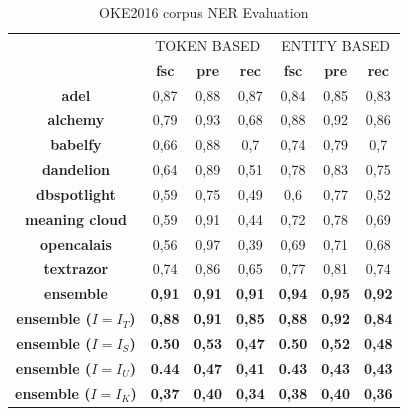 \documentclass{llncs}
\begin{document}
\begin{table}
    \setlength{\tabcolsep}{12pt}
    \centering
    \begin{tabular}{c|c|c|c|c|c|c|}
      \multicolumn{1}{c}{ } &
      \multicolumn{3}{|c|}{TOKEN BASED} & 
      \multicolumn{3}{|c|}{ENTITY BASED} \\
       \multicolumn{1}{c|}{ } & \textbf{fsc} & \textbf{pre} & \textbf{rec}
       & \textbf{fsc} & \textbf{pre} & \textbf{rec} \\ \hline
        \textbf{adel}            & 0,87   & 0,88   & 0,87 & 0,84  & 0,85  & 0,83 \\ \hline
        \textbf{alchemy}         & 0,79   & 0,93   & 0,68 & 0,88  & 0,92  & 0,86 \\ \hline
        \textbf{babelfy}         & 0,66   & 0,88   & 0,7  & 0,74  & 0,79  & 0,7  \\ \hline
        \textbf{dandelion}       & 0,64   & 0,89   & 0,51 & 0,78  & 0,83  & 0,75 \\ \hline
        \textbf{dbspotlight}     & 0,59   & 0,75   & 0,49 & 0,6   & 0,77  & 0,52 \\ \hline
        \textbf{meaning cloud}   & 0,59   & 0,91   & 0,44 & 0,72  & 0,78  & 0,69 \\ \hline
        \textbf{opencalais}      & 0,56   & 0,97   & 0,39 & 0,69  & 0,71  & 0,68 \\ \hline
        \textbf{textrazor}       & 0,74   & 0,86   & 0,65 & 0,77  & 0,81  & 0,74 \\ \hline \hline
        \textbf{ensemble}        & \textbf{0,91}   & \textbf{0,91}   & \textbf{0,91}  & \textbf{0,94} & \textbf{0,95}  & \textbf{0,92} \\ \hline
       \textbf{ensemble ($I=I_T$)}        & \textbf{0,88}   & \textbf{0,91}   & \textbf{0,85}  & \textbf{0,88} & \textbf{0,92}  & \textbf{0,84} \\\hline
       \textbf{ensemble ($I=I_S$)}        & \textbf{0.50}   & \textbf{0,53}   & \textbf{0,47}  & \textbf{0.50} & \textbf{0,52}  & \textbf{0,48} \\\hline    
       \textbf{ensemble ($I=I_U$)}        & \textbf{0.44}   & \textbf{0,47}   & \textbf{0,41}  & \textbf{0.43} & \textbf{0,43}  & \textbf{0,43} \\\hline
       \textbf{ensemble ($I=I_K$)}        & \textbf{0,37}   & \textbf{0,40}   & \textbf{0,34}  & \textbf{0,38} & \textbf{0,40}  & \textbf{0,36} \\\hline    
    \end{tabular}
    \caption{OKE2016 corpus NER Evaluation}
    \label{typescoresOKE2016}
\end{table}
\end{document}
